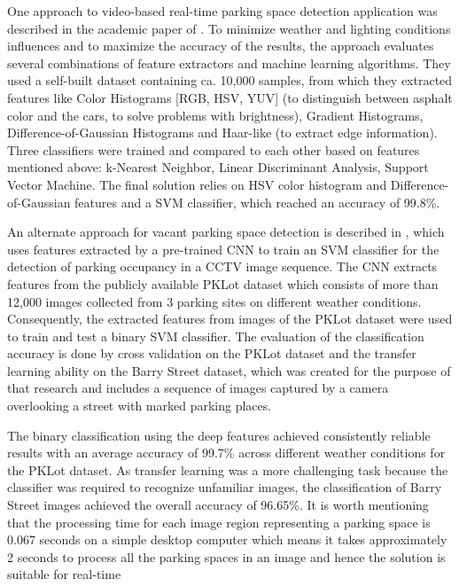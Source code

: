 \documentclass[runningheads,a4paper,11pt]{report}
\begin{document}
One approach to video-based real-time parking space detection application 
was described in the academic paper of \cite{tschentscher}. To minimize 
weather and lighting conditions influences and to maximize the accuracy of the 
results, the approach evaluates several combinations of feature extractors and 
machine learning algorithms. They used a self-built dataset containing 
ca. 10,000 samples, from which they extracted features like 
Color Histograms [RGB, HSV, YUV] (to distinguish between asphalt color and the 
cars, to solve problems with brightness), Gradient Histograms, 
Difference-of-Gaussian Histograms and Haar-like (to extract edge information). 
Three classifiers were trained and compared to each other based on features 
mentioned above: k-Nearest Neighbor, Linear Discriminant Analysis, Support 
Vector Machine. The final solution relies on HSV color histogram and 
Difference-of-Gaussian features and a SVM classifier, which reached an 
accuracy of 99.8\%.
\par
An alternate approach for vacant parking space detection is described in 
\cite{debaditya}, which uses features extracted by a pre-trained CNN to 
train an SVM classifier for the detection of parking occupancy in a 
CCTV image sequence.
The CNN extracts features from the publicly available PKLot dataset which 
consists of more than 12,000 images collected from 3 parking sites on 
different weather conditions. 
Consequently, the extracted features from images of the PKLot dataset 
were used to train and test a binary SVM classifier.
The evaluation of the classification accuracy is done by cross validation 
on the PKLot dataset and the transfer learning ability on the Barry 
Street dataset, which was created for the purpose of that research and 
includes a sequence of images captured by a camera overlooking a street 
with marked parking places.
\par
The binary classification using the deep features achieved consistently 
reliable results with an average accuracy of 99.7\% across different weather 
conditions for the PKLot dataset.
As transfer learning was a more challenging task because the classifier 
was required to recognize unfamiliar images, the classification of Barry 
Street images achieved the overall accuracy of 96.65\%.
It is worth mentioning that the processing time for each image region 
representing a parking space is 0.067 seconds on a simple desktop computer 
which means it takes approximately 2 seconds to process all the parking 
spaces in an image and hence the solution is suitable for real-time 
\end{document}
